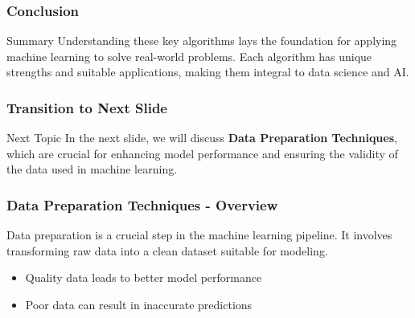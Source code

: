 \documentclass{beamer}
\begin{document}
\begin{frame}[fragile]
    \frametitle{Conclusion}
    \begin{block}{Summary}
        Understanding these key algorithms lays the foundation for applying machine learning to solve real-world problems. Each algorithm has unique strengths and suitable applications, making them integral to data science and AI.
    \end{block}
\end{frame}

\begin{frame}[fragile]
    \frametitle{Transition to Next Slide}
    \begin{block}{Next Topic}
        In the next slide, we will discuss \textbf{Data Preparation Techniques}, which are crucial for enhancing model performance and ensuring the validity of the data used in machine learning.
    \end{block}
\end{frame}

\begin{frame}[fragile]
    \frametitle{Data Preparation Techniques - Overview}
    Data preparation is a crucial step in the machine learning pipeline. It involves transforming raw data into a clean dataset suitable for modeling. 
    \begin{itemize}
        \item Quality data leads to better model performance
        \item Poor data can result in inaccurate predictions
    \end{itemize}
\end{frame}
\end{document}
